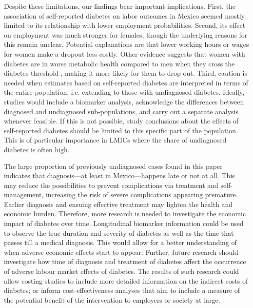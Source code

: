 \documentclass[12pt,english]{article}
\begin{document}
Despite these limitations, our findings bear important implications. First, the association of self-reported diabetes on labor outcomes in Mexico seemed mostly limited to its relationship with lower employment probabilities.  Second, its effect on employment was much stronger for females, though the underlying reasons for this remain unclear. Potential explanations are that lower working hours or wages for women make a dropout less costly. Other evidence suggests that women with diabetes are in worse metabolic health compared to men when they cross the diabetes threshold \parencite{Peters2015}, making it more likely for them to drop out. Third, caution is needed when estimates based on self-reported diabetes are interpreted in terms of the entire population, i.e. extending to those with undiagnosed diabetes. Ideally, studies would include a biomarker analysis, acknowledge the differences between diagnosed and undiagnosed sub-populations, and carry out a separate analysis whenever feasible. If this is not possible, study conclusions about the effects of self-reported diabetes should be limited to this specific part of the population. This is of particular importance in \acp{LMIC} where the share of undiagnosed diabetes is often high.  

The large proportion of previously undiagnosed cases found in this paper indicates that diagnosis---at least in Mexico---happens late or not at all. This may reduce the possibilities to prevent complications via treatment and self-management, increasing the risk of severe complications appearing premature. Earlier diagnosis and ensuing effective treatment may lighten the health and economic burden. Therefore, more research is needed to investigate the economic impact of diabetes over time. Longitudinal biomarker information could be used to observe the true duration and severity of diabetes as well as the time that passes till a medical diagnosis. This would allow for a better understanding of when adverse economic effects start to appear. Further, future research should investigate how time of diagnosis and treatment of diabetes affect the occurrence of adverse labour market effects of diabetes. The results of such research could allow costing studies to include more detailed information on the indirect costs of diabetes; or inform cost-effectiveness analyses that aim to include a measure of the potential benefit of the intervention to employers or society at large. 

\printbibliography


\clearpage
\setcounter{table}{0}
\renewcommand{\thetable}{S\arabic{table}}
\setcounter{figure}{0}
\setcounter{page}{1}
\renewcommand{\thefigure}{S\arabic{figure}} %
\end{document}
